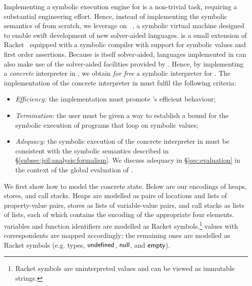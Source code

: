 Implementing a symbolic execution engine for \jsil is a non-trivial 
task, requiring a substantial engineering effort. 
% 
% 
Hence, instead of implementing the symbolic semantics of \jsil from scratch, we leverage on 
\rosette~\cite{Rosette1,Rosette2}, a symbolic virtual machine designed to 
enable swift development of new 
solver-aided languages. 
%
\rosette is a small extension of Racket~\cite{racket} equipped with a symbolic compiler with support 
for symbolic values and first order assertions. Because \rosette is itself solver-aided, languages 
implemented in \rosette can also make use of the solver-aided facilities provided by \rosette. 
Hence, by implementing a \emph{concrete} \jsil interpreter in \rosette, we obtain \emph{for free} a symbolic 
interpreter for \jsil. %
%
The implementation of the concrete interpreter in \rosette must fulfil the following criteria:
\begin{itemize}          
   \item \emph{Efficiency:} the implementation must promote \rosette's efficient behaviour;
   
   \item \emph{Termination:} the user must be given a way to establish a bound for the symbolic execution 
            of programs that loop on symbolic values; 
  
   \item \emph{Adequacy:} the symbolic execution of the concrete interpreter in \rosette 
            must be consistent with the symbolic semantics described in \S\ref{subsec:jsil:analysis:formalism}. 
            We discuss adequacy in \S\ref{sec:evaluation} in the context of the global evaluation 
            of \jilette.
\end{itemize}


We first show
how to model the concrete \jsil state. Below are our \rosette encodings of \jsil heaps, stores, 
and call stacks. 
Heaps are modelled as pairs of locations and lists of property-value pairs, 
stores as lists of variable-value pairs, and call stacks as lists of lists, each of which
contains the \rosette encoding of the appropriate four elements. 
\jsil variables and function identifiers are modelled 
as Racket symbols.\footnote{Racket symbols are uninterpreted values and can be viewed as immutable strings.} 
\jsil values with \rosette correspondents are mapped accordingly; the remaining 
ones are modelled as Racket symbols (e.g. \jsil types, ${{\sf undefined}}$, ${\sf null}$, and ${\sf empty}$). 

